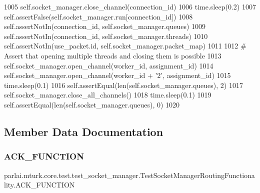 \begin{DoxyCode}
1005         self.socket\_manager.close\_channel(connection\_id)
1006         time.sleep(0.2)
1007         self.assertFalse(self.socket\_manager.run[connection\_id])
1008         self.assertNotIn(connection\_id, self.socket\_manager.queues)
1009         self.assertNotIn(connection\_id, self.socket\_manager.threads)
1010         self.assertNotIn(use\_packet.id, self.socket\_manager.packet\_map)
1011 
1012         \textcolor{comment}{# Assert that opening multiple threads and closing them is possible}
1013         self.socket\_manager.open\_channel(worker\_id, assignment\_id)
1014         self.socket\_manager.open\_channel(worker\_id + \textcolor{stringliteral}{'2'}, assignment\_id)
1015         time.sleep(0.1)
1016         self.assertEqual(len(self.socket\_manager.queues), 2)
1017         self.socket\_manager.close\_all\_channels()
1018         time.sleep(0.1)
1019         self.assertEqual(len(self.socket\_manager.queues), 0)
1020 
\end{DoxyCode}


\subsection{Member Data Documentation}
\mbox{\label{classparlai_1_1mturk_1_1core_1_1test_1_1test__socket__manager_1_1TestSocketManagerRoutingFunctionality_a604b7aa2981b1f2174926216879f027e}} 
\subsubsection{\texorpdfstring{A\+C\+K\+\_\+\+F\+U\+N\+C\+T\+I\+ON}{ACK\_FUNCTION}}
{\footnotesize\ttfamily parlai.\+mturk.\+core.\+test.\+test\+\_\+socket\+\_\+manager.\+Test\+Socket\+Manager\+Routing\+Functionality.\+A\+C\+K\+\_\+\+F\+U\+N\+C\+T\+I\+ON\hspace{0.3cm}{\ttfamily [static]}}



